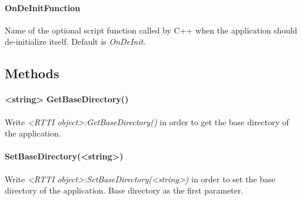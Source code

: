 \paragraph{OnDeInitFunction}
Name of the optional script function called by C++ when the application should de-initialize itself. Default is \emph{OnDeInit}.


\subsection{Methods}

\paragraph{<string> GetBaseDirectory()}
Write \emph{<RTTI object>:GetBaseDirectory()} in order to get the base directory of the application.

\paragraph{SetBaseDirectory(<string>)}
Write \emph{<RTTI object>:SetBaseDirectory(<string>)} in order to set the base directory of the application. Base directory as the first parameter.
